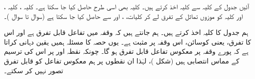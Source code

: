 آئیں    جدول  کے کلیہ  سے کلیہ  اخذ   کرتے ہیں۔ 
کلیہ    بھی اسی طرح حاصل کیا جا سکتا ہے۔  کلیہ ، کلیہ ،  اور کلیہ 
کو موزوں تماثل کے  تفرق  لے کر   کلیات،  ،  اور     سے حاصل کیا جا سکتا ہے (سوال  تا سوال )۔

ہم   جدول  کا  کلیہ  اخذ کرتے ہیں۔ ہم جانتے ہیں کہ وقفہ  میں تفاعل  قابل تفرق ہے اور اس کا تفرق، یعنی کوسائن، اس وقفہ پر مثبت ہے۔ یوں حصہ   کا  مسئلہ  ہمیں یقین دہانی کراتا ہے  کہ پورے وقفہ  پر معکوس تفاعل  قابل تفرق ہو گا۔ چونکہ نقطہ  اور  پر اس کی ترسیم کے مماس انتصابی ہیں (شکل )، لہٰذا ان نقطوں  پر ہم  معکوس تفاعل  کو قابل تفرق تصور نہیں کر سکتے۔ 
